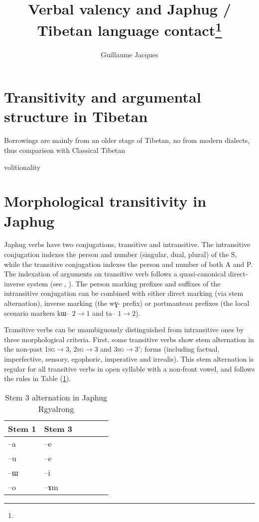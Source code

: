 \documentclass[oldfontcommands,oneside,a4paper,11pt]{article}
\newcommand{\ipa}[1]{{\phon \mbox{#1}}} %
\newcommand{\refb}[1]{(\ref{#1})}
\begin{document}
 
\title{Verbal valency and Japhug / Tibetan language contact\footnote{
} }
\author{Guillaume Jacques}
\maketitle

\section{Transitivity and argumental structure in Tibetan}
Borrowings are mainly from an older stage of Tibetan, no from modern dialects, thus comparison with Classical Tibetan


volitionality

\section{Morphological transitivity in Japhug}

Japhug verbs have two conjugations, transitive and intransitive. The intransitive conjugation indexes the person and number (singular, dual, plural) of the S, while the transitive conjugation indexes the person and number of both A and P. The indexation of arguments on transitive verb follows a quasi-canonical direct-inverse system (see \citealt{jacques10inverse}, \citealt{jacques14inverse}). The person marking prefixes and suffixes of the intransitive conjugation can be combined with either direct marking (via stem alternation), inverse marking (the \ipa{wɣ-} prefix) or portmanteau prefixes (the local scenario markers \ipa{kɯ--} $2\rightarrow1$ and \ipa{ta--} $1\rightarrow2$).

Transitive verbs can be unambiguously distinguished from intransitive ones by three morphological criteria. First, some transitive verbs show stem alternation in the non-past \textsc{1sg}$\rightarrow$3, \textsc{2sg}$\rightarrow$3 and \textsc{3sg}$\rightarrow$3'; forms (including factual, imperfective, sensory, egophoric, imperative and irrealis). This stem alternation is regular for all transitive verbs in open syllable with a non-front vowel, and follows the rules   in Table \refb{tab:stem3}.

 \begin{table} 
\caption{Stem 3 alternation in Japhug Rgyalrong} \label{tab:stem3} \centering
\begin{tabular}{llllll}
\toprule
Stem 1 & Stem 3 \\
\midrule
\ipa{--a} & \ipa{--e} \\
\ipa{--u} & \ipa{--e} \\
\ipa{--ɯ} & \ipa{--i} \\
\ipa{--o} & \ipa{--ɤm} \\
\bottomrule
\end{tabular}
\end{table}
\end{document}

